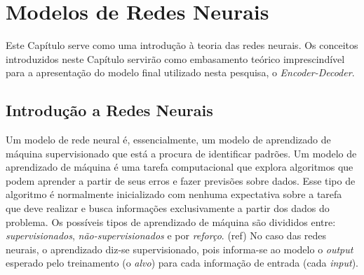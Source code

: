 \chapter{Modelos de Redes Neurais}
\label{ch:03}



Este Capítulo serve como uma introdução à teoria das redes neurais. Os conceitos introduzidos neste Capítulo servirão como embasamento teórico imprescindível para a apresentação do modelo final utilizado nesta pesquisa, o \textit{Encoder-Decoder}. 

\section{Introdução a Redes Neurais}

Um modelo de rede neural é, essencialmente, um modelo de aprendizado de máquina supervisionado %
que está a procura de identificar padrões. Um modelo de aprendizado de máquina é uma tarefa computacional que explora algoritmos que podem aprender a partir de seus erros e fazer previsões sobre dados. Esse tipo de algoritmo é normalmente inicializado com nenhuma expectativa sobre a tarefa que deve realizar e busca informações exclusivamente a partir dos dados do problema. Os possíveis tipos de aprendizado de máquina são divididos entre: \textit{supervisionados}, \textit{não-supervisionados}
e por \textit{reforço}. (ref)
No caso das redes neurais, o aprendizado diz-se supervisionado, pois informa-se ao modelo o \textit{output} esperado  pelo treinamento (o \textit{alvo}) para cada informação de entrada (cada \textit{input}).

